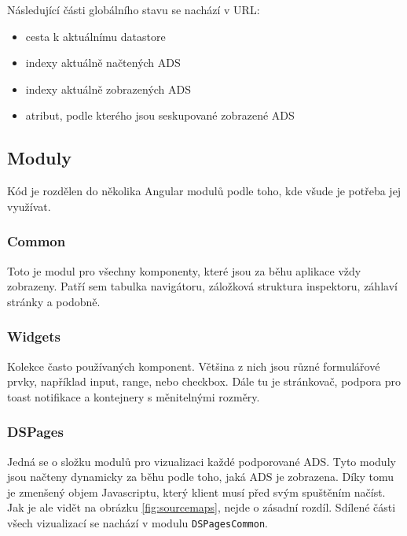 Následující části globálního stavu se nachází v URL:

\begin{itemize}
  \item cesta k aktuálnímu datastore
  \item indexy aktuálně načtených ADS
  \item indexy aktuálně zobrazených ADS
  \item atribut, podle kterého jsou seskupované zobrazené ADS
\end{itemize}

\subsection{Moduly}

Kód je rozdělen do několika Angular modulů podle toho, kde všude je potřeba jej využívat.

\subsubsection*{Common}

Toto je modul pro všechny komponenty, které jsou za běhu aplikace vždy zobrazeny. Patří sem tabulka navigátoru, záložková struktura inspektoru, záhlaví stránky a podobně.

\subsubsection*{Widgets}

Kolekce často používaných komponent. Většina z nich jsou různé formulářové prvky, například input, range, nebo checkbox. Dále tu je stránkovač, podpora pro toast notifikace a kontejnery s měnitelnými rozměry.

\subsubsection*{DSPages}

Jedná se o složku modulů pro vizualizaci každé podporované ADS. Tyto moduly jsou načteny dynamicky za běhu podle toho, jaká ADS je zobrazena. Díky tomu je zmenšený objem Javascriptu, který klient musí před svým spuštěním načíst. Jak je ale vidět na obrázku \ref{fig:sourcemaps}, nejde o zásadní rozdíl. Sdílené části všech vizualizací se nachází v modulu \lstinline|DSPagesCommon|.

